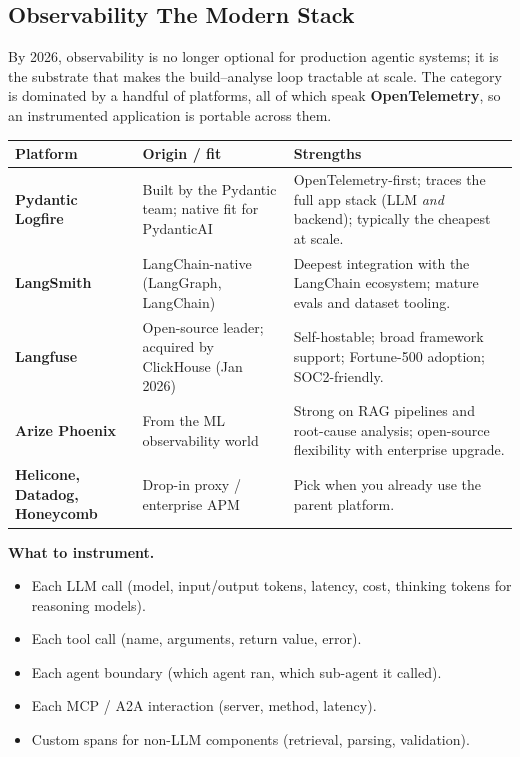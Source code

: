 \documentclass[a4paper,11pt]{article}
\begin{document}
\subsection{Observability \textemdash{} The Modern Stack}

By 2026, observability is no longer optional for production agentic
systems; it is the substrate that makes the build–analyse loop
tractable at scale. The category is dominated by a handful of
platforms, all of which speak \textbf{OpenTelemetry}, so an
instrumented application is portable across them.

\begin{center}\small
\begin{tabular}{p{3.2cm} p{4.6cm} p{5.0cm}}
  \toprule
  \textbf{Platform} & \textbf{Origin / fit} & \textbf{Strengths} \\
  \midrule
  \textbf{Pydantic Logfire} &
    Built by the Pydantic team; native fit for PydanticAI &
    OpenTelemetry-first; traces the full app stack (LLM \emph{and} backend); typically the cheapest at scale. \\
  \addlinespace
  \textbf{LangSmith} &
    LangChain-native (LangGraph, LangChain) &
    Deepest integration with the LangChain ecosystem; mature evals and dataset tooling. \\
  \addlinespace
  \textbf{Langfuse} &
    Open-source leader; acquired by ClickHouse (Jan 2026) &
    Self-hostable; broad framework support; Fortune-500 adoption; SOC2-friendly. \\
  \addlinespace
  \textbf{Arize Phoenix} &
    From the ML observability world &
    Strong on RAG pipelines and root-cause analysis; open-source flexibility with enterprise upgrade. \\
  \addlinespace
  \textbf{Helicone, Datadog, Honeycomb} &
    Drop-in proxy / enterprise APM &
    Pick when you already use the parent platform. \\
  \bottomrule
\end{tabular}
\end{center}

\textbf{What to instrument.}
\begin{itemize}[noitemsep, leftmargin=1.2em]
  \item Each LLM call (model, input/output tokens, latency, cost,
        thinking tokens for reasoning models).
  \item Each tool call (name, arguments, return value, error).
  \item Each agent boundary (which agent ran, which sub-agent it
        called).
  \item Each MCP / A2A interaction (server, method, latency).
  \item Custom spans for non-LLM components (retrieval, parsing,
        validation).
\end{itemize}
\end{document}
